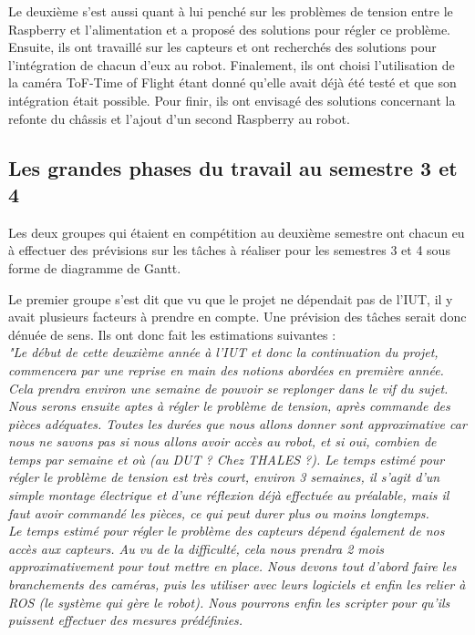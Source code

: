 \documentclass{PackagerQualityN}
\begin{document}
Le deuxième s’est aussi quant à lui penché sur les problèmes de tension entre le Raspberry et l’alimentation et a proposé des solutions pour régler ce problème. Ensuite, ils ont travaillé sur les capteurs et ont recherchés des solutions pour l’intégration de chacun d’eux au robot. Finalement, ils ont choisi l’utilisation de la caméra ToF-Time of Flight étant donné qu'elle avait déjà été testé et que son intégration était possible. Pour finir, ils ont envisagé des solutions concernant la refonte du châssis et l’ajout d’un second Raspberry au robot.

\subsection*{Les grandes phases du travail au semestre 3 et 4}
Les deux groupes qui étaient en compétition au deuxième semestre ont chacun eu à effectuer des prévisions sur les tâches à réaliser pour les semestres 3 et 4 sous forme de diagramme de Gantt.


Le premier groupe s’est dit que vu que le projet ne dépendait pas de l’IUT, il y avait plusieurs facteurs à prendre en compte. Une prévision des tâches serait donc dénuée de sens. Ils ont donc fait les estimations suivantes :\\

\textit{"Le début de cette deuxième année à l’IUT et donc la continuation du projet, commencera par une reprise en main des notions abordées en première année. Cela prendra environ une semaine de pouvoir se replonger dans le vif du sujet.}\\

\textit{Nous serons ensuite aptes à régler le problème de tension, après commande des pièces adéquates. Toutes les durées que nous allons donner sont approximative car nous ne savons pas si nous allons avoir accès au robot, et si oui, combien de temps par semaine et où (au DUT ? Chez THALES ?).
Le temps estimé pour régler le problème de tension est très court, environ 3 semaines, il s’agit d’un simple montage électrique et d’une réflexion déjà effectuée au préalable, mais il faut avoir commandé les pièces, ce qui peut durer plus ou moins longtemps.}\\

\textit{Le temps estimé pour régler le problème des capteurs dépend également de nos accès aux capteurs. Au vu de la difficulté, cela nous prendra 2 mois approximativement pour tout mettre en place. Nous devons tout d’abord faire les branchements des caméras, puis les utiliser avec leurs logiciels et enfin les relier à ROS (le système qui gère le robot). Nous pourrons enfin les scripter pour qu’ils puissent effectuer des mesures prédéfinies.}\\
\end{document}
